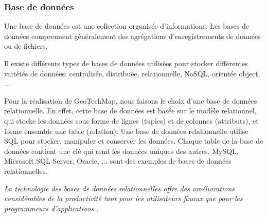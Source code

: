         \subsubsection{Base de données}
         Une base de données est une collection organisée d'informations. Les bases de données
         comprennent généralement des agrégations d'enregistrements de données ou de fichiers. 
         \par 
         Il existe différents types de bases de données utilisées pour stocker différentes 
         variétés de données: centralisée, distribuée, relationnelle, NoSQL, 
         orientée object, ... \cite{typedb}
         \par 
         Pour la réalisation de GeoTechMap, nous faisons le choix d'une base de données relationnelle.
         En effet, cette base de données est basée sur le modèle relationnel, qui stocke les 
         données sous forme de lignes (tuples) et de colonnes (attributs), et forme ensemble une table 
         (relation). Une base de données relationnelle utilise SQL pour stocker, manipuler et conserver 
         les données. Chaque table de la base de données 
         contient une clé qui rend les données uniques des autres. MySQL, Microsoft SQL Server, Oracle, ... 
         sont des exemples de bases de données relationnelles.
         \par 
         \textit{La technologie des bases de données relationnelles offre des améliorations considérables 
         de la productivité tant pour les utilisateurs finaux que pour les programmeurs d'applications \cite{codd1989relational}.}
